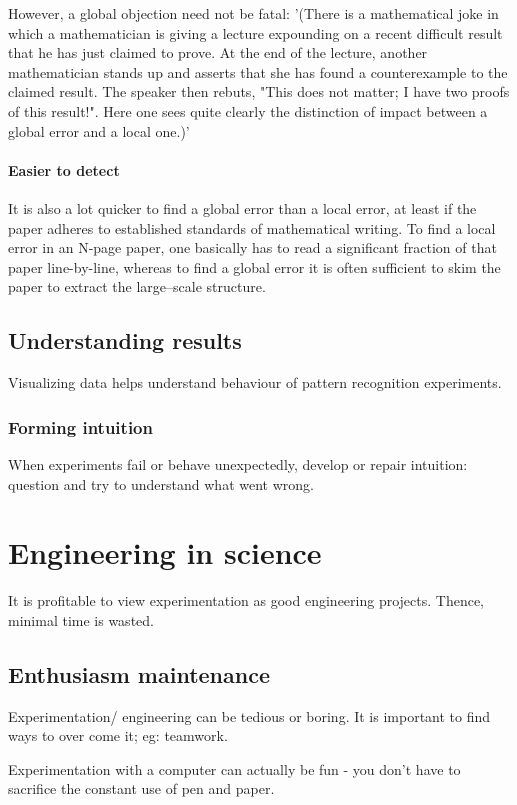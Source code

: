 \documentclass[oneside, article]{memoir}
\begin{document}
However, a global objection need not be fatal: '(There is a mathematical joke in which a mathematician is giving a lecture expounding on a recent difficult result that he has just claimed to prove. At the end of the lecture, another mathematician stands up and asserts that she has found a counterexample to the claimed result. The speaker then rebuts, "This does not matter; I have two proofs of this result!". Here one sees quite clearly the distinction of impact between a global error and a local one.)'

\paragraph*{Easier to detect}
It is also a lot quicker to find a global error than a local error, at least if the paper adheres to established standards of mathematical writing. To find a local error in an N-page paper, one basically has to read a significant fraction of that paper line-by-line, whereas to find a global error it is often sufficient to skim the paper to extract the large--scale structure. 

\subsection{Understanding results}
Visualizing data helps understand behaviour of pattern recognition experiments.

\subsubsection{Forming intuition}
When experiments fail or behave unexpectedly, develop or repair intuition: question and try to understand what went wrong.

\section{Engineering in science}
It is profitable to view experimentation as good engineering projects. Thence, minimal time is wasted.

\subsection{Enthusiasm maintenance}
Experimentation/ engineering can be tedious or boring. It is important to find ways to over come it; eg: teamwork.

Experimentation with a computer can actually be fun - you don't have to sacrifice the constant use of pen and paper.
\end{document}
